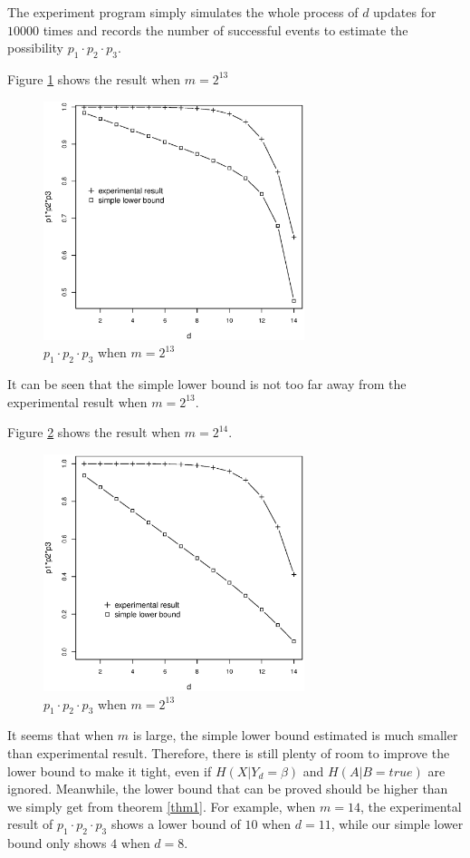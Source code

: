 \documentclass[10pt, conference, compsocconf]{IEEEtran}
\begin{document}
		The experiment program simply simulates the whole process of $d$ updates
		for $10000$ times and records the number of successful events
		to estimate the possibility $p_1 \cdot p_2 \cdot p_3$.
		
		Figure \ref{p13} shows the result when $m = 2^{13}$
		
		\begin{figure}[!t]
		\centering
		\includegraphics[width=3in]{p13.eps}
		\caption{$p_1 \cdot p_2 \cdot p_3$ when $m = 2^{13}$}\label{p13}
		\end{figure}

		It can be seen that the simple lower bound is not too
		far away from the experimental result when $m = 2^{13}$.
		
		Figure \ref{p14} shows the result when $m = 2^{14}$.
		\begin{figure}[!t]
		\centering
		\includegraphics[width=3in]{p14.eps}
		\caption{$p_1 \cdot p_2 \cdot p_3$ when $m = 2^{13}$}\label{p14}
		\end{figure}
		
		It seems that when $m$ is large, the simple lower bound
		estimated is much smaller than experimental result. Therefore,
		there is still plenty of room to improve the lower bound
		to make it tight, even if $H(X | Y_d = \beta)$ and $H(A | B = true)$ 
		are ignored. Meanwhile, the lower bound that can be proved should
		be higher than we simply get from theorem \ref{thm1}.
		For example, when $m = 14$, the experimental result
		of $p_1 \cdot p_2 \cdot p_3$ shows a lower bound of $10$
		when $d = 11$, while our simple lower bound only shows $4$
		when $d = 8$.
		
\end{document}
